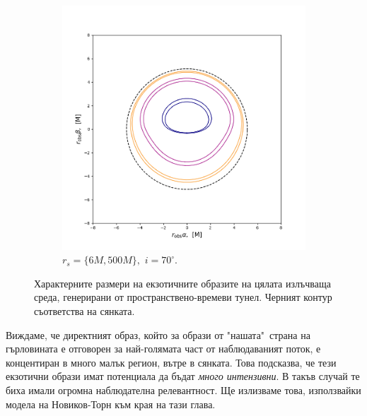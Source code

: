 \begin{figure}[!htb]
\begin{subfigure}{6cm}
		\includegraphics[scale = 0.35]{WH_70_deg_r6_r500.png}
		\caption{$r_s = \{6M, 500M\},\,\, i = 70^\circ$.}
	\end{subfigure}
	\caption[Характерните размери на екзотичните образите на цялата излъчваща среда, генерирани от пространствено-времеви тунел.]{\small Характерните размери на екзотичните образите на цялата излъчваща среда, генерирани от пространствено-времеви тунел. Черният контур съответства на сянката.} 
	\label{WH_img_size_deg}
\end{figure}
Виждаме, че директният образ, който за образи от "нашата"$\,$ страна на гърловината е отговорен за най-голямата част от наблюдаваният поток, е концентиран в много малък регион, вътре в сянката. Това подсказва, че тези екзотични образи имат потенциала да бъдат \emph{много интензивни}. В такъв случай те биха имали огромна наблюдателна релевантност. Ще излизваме това, използвайки модела на Новиков-Торн към края на тази глава.\\ 

